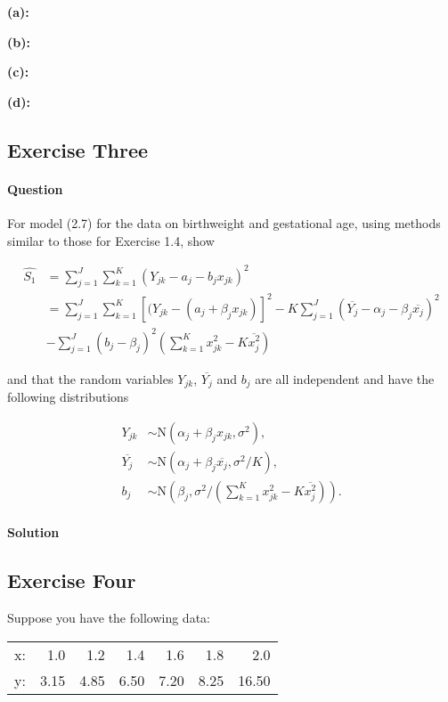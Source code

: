 \documentclass[]{article}
\let\oldparagraph\paragraph
\renewcommand{\paragraph}[1]{\oldparagraph{#1}\mbox{}}
\begin{document}
\textbf{(a):}

\textbf{(b):}

\textbf{(c):}

\textbf{(d):}

\subsection{Exercise Three}\label{exercise-three}

\paragraph{Question}\label{question-2}

For model (2.7) for the data on birthweight and gestational age, using
methods similar to those for Exercise 1.4, show

\begin{align*}
\hat{S_1} &= \sum_{j=1}^J\sum_{k=1}^K(Y_{jk} - a_j - b_jx_{jk})^2\\
 &= \sum_{j=1}^J\sum_{k=1}^K[(Y_{jk} - (a_j + \beta_jx_{jk})]^2 - K\sum_{j=1}^J(\overline{Y_j} - \alpha_j - \beta_j\overline{x_j})^2\\
 &-\sum_{j=1}^J(b_j - \beta_j)^2(\sum_{k=1}^K x_{jk}^2 - K\overline{x_j^2})
\end{align*}

and that the random variables \(Y_{jk}\), \(\overline{Y_j}\) and \(b_j\)
are all independent and have the following distributions

\begin{align*}
Y_{jk} &\sim \text{N}(\alpha_j + \beta_jx_{jk}, \sigma^2),   \\
\overline{Y_j} &\sim \text{N}(\alpha_j + \beta_j\overline{x_j}, \sigma^2/K),    \\
b_j &\sim \text{N}(\beta_j, \sigma^2/(\sum_{k=1}^K x_{jk}^2 - K\overline{x^2_j})).
\end{align*}

\paragraph{Solution}\label{solution-2}

\subsection{Exercise Four}\label{exercise-four}

Suppose you have the following data:

\begin{center}
\begin{tabular}{lrrrrrr}
\hline
x: & 1.0  & 1.2  & 1.4  & 1.6  & 1.8  & 2.0   \\
y: & 3.15 & 4.85 & 6.50 & 7.20 & 8.25 & 16.50 \\ \hline
\end{tabular}
\end{center}
\end{document}

